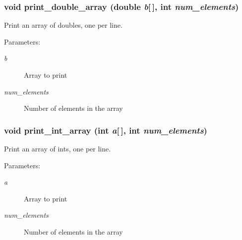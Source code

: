 \subsubsection{\setlength{\rightskip}{0pt plus 5cm}void print\_\-double\_\-array (double {\em b}[$\,$], int {\em num\_\-elements})}\label{print__arrays_8h_6c11f9531a38b3ced81f1556a72f9dcd}


Print an array of doubles, one per line. \begin{Desc}
\item[Parameters:]
\begin{description}
\item[{\em b}]Array to print \item[{\em num\_\-elements}]Number of elements in the array \end{description}
\end{Desc}
\subsubsection{\setlength{\rightskip}{0pt plus 5cm}void print\_\-int\_\-array (int {\em a}[$\,$], int {\em num\_\-elements})}\label{print__arrays_8h_a5e6807121f9ade71432e51859d75c92}


Print an array of ints, one per line. \begin{Desc}
\item[Parameters:]
\begin{description}
\item[{\em a}]Array to print \item[{\em num\_\-elements}]Number of elements in the array \end{description}
\end{Desc}
